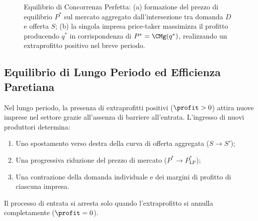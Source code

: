 \begin{figure}[htbp]
\caption{Equilibrio di Concorrenza Perfetta: (a) formazione del prezzo di equilibrio $P^*$ sul mercato aggregato dall'intersezione tra domanda $D$ e offerta $S$; (b) la singola impresa price-taker massimizza il profitto producendo $q^*$ in corrispondenza di $P^* = \CMg(q^*)$, realizzando un extraprofitto positivo nel breve periodo.}
\label{fig:concorrenza_perfetta_equilibrio}
\end{figure}

\subsection{Equilibrio di Lungo Periodo ed Efficienza Paretiana}
Nel lungo periodo, la presenza di extraprofitti positivi ($\profit > 0$) attira nuove imprese nel settore grazie all'assenza di barriere all'entrata. L'ingresso di nuovi produttori determina:
\begin{enumerate}
    \item Uno spostamento verso destra della curva di offerta aggregata ($S \to S'$);
    \item Una progressiva riduzione del prezzo di mercato ($P^* \to P_{\text{LP}}^*$);
    \item Una contrazione della domanda individuale e dei margini di profitto di ciascuna impresa.
\end{enumerate}
Il processo di entrata si arresta solo quando l'extraprofitto si annulla completamente ($\profit = 0$).

